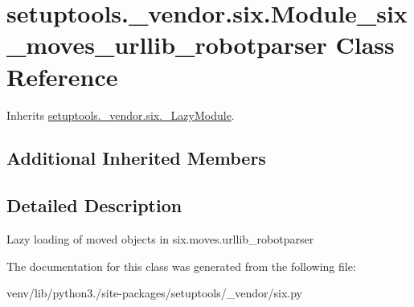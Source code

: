 \hypertarget{classsetuptools_1_1__vendor_1_1six_1_1_module__six__moves__urllib__robotparser}{}\section{setuptools.\+\_\+vendor.\+six.\+Module\+\_\+six\+\_\+moves\+\_\+urllib\+\_\+robotparser Class Reference}
\label{classsetuptools_1_1__vendor_1_1six_1_1_module__six__moves__urllib__robotparser}


Inherits \hyperlink{classsetuptools_1_1__vendor_1_1six_1_1___lazy_module}{setuptools.\+\_\+vendor.\+six.\+\_\+\+Lazy\+Module}.

\subsection*{Additional Inherited Members}


\subsection{Detailed Description}
\begin{DoxyVerb}Lazy loading of moved objects in six.moves.urllib_robotparser\end{DoxyVerb}
 

The documentation for this class was generated from the following file\+:\begin{DoxyCompactItemize}
\item 
venv/lib/python3./site-\/packages/setuptools/\+\_\+vendor/six.\+py\end{DoxyCompactItemize}
